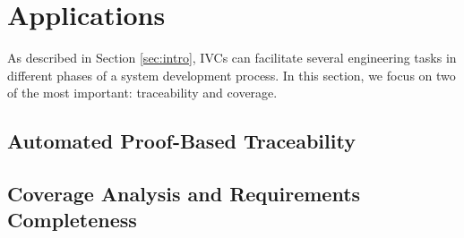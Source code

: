 \section{Applications}
\label{sec:apps}
As described in Section \ref{sec:intro}, IVCs can facilitate several engineering tasks in different phases of a system development process.  In this section, we focus on two of the most important: traceability and coverage.

\iffalse
\fi

\subsection{Automated Proof-Based Traceability}



\subsection{Coverage Analysis and Requirements Completeness}






%
